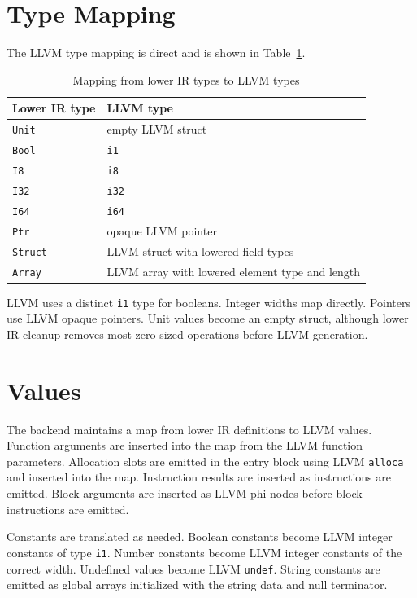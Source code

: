 \section{Type Mapping}

The LLVM type mapping is direct and is shown in Table~\ref{tab:llvm-types}.

\begin{table}[H]
  \centering
  \begin{tabular}{p{}p{}}
    \toprule
    Lower IR type & LLVM type \\
    \midrule
    \texttt{Unit} & empty LLVM struct \\
    \texttt{Bool} & \texttt{i1} \\
    \texttt{I8} & \texttt{i8} \\
    \texttt{I32} & \texttt{i32} \\
    \texttt{I64} & \texttt{i64} \\
    \texttt{Ptr} & opaque LLVM pointer \\
    \texttt{Struct} & LLVM struct with lowered field types \\
    \texttt{Array} & LLVM array with lowered element type and length \\
    \bottomrule
  \end{tabular}
  \caption{Mapping from lower IR types to LLVM types}
  \label{tab:llvm-types}
\end{table}

LLVM uses a distinct \texttt{i1} type for booleans. Integer widths map
directly. Pointers use LLVM opaque pointers. Unit values become an empty struct,
although lower IR cleanup removes most zero-sized operations before LLVM
generation.

\section{Values}

The backend maintains a map from lower IR definitions to LLVM values. Function
arguments are inserted into the map from the LLVM function parameters. Allocation
slots are emitted in the entry block using LLVM \texttt{alloca} and inserted
into the map. Instruction results are inserted as instructions are emitted.
Block arguments are inserted as LLVM phi nodes before block instructions are
emitted.

Constants are translated as needed. Boolean constants become LLVM integer
constants of type \texttt{i1}. Number constants become LLVM integer constants of
the correct width. Undefined values become LLVM \texttt{undef}. String constants
are emitted as global arrays initialized with the string data and null
terminator.

